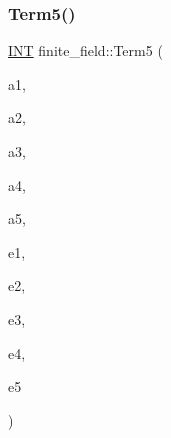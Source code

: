 \subsubsection{\texorpdfstring{Term5()}{Term5()}}
{\footnotesize\ttfamily \mbox{\hyperlink{galois_8h_a09fddde158a3a20bd2dcadb609de11dc}{I\+NT}} finite\+\_\+field\+::\+Term5 (\begin{DoxyParamCaption}\item[{\mbox{\hyperlink{galois_8h_a09fddde158a3a20bd2dcadb609de11dc}{I\+NT}}}]{a1,  }\item[{\mbox{\hyperlink{galois_8h_a09fddde158a3a20bd2dcadb609de11dc}{I\+NT}}}]{a2,  }\item[{\mbox{\hyperlink{galois_8h_a09fddde158a3a20bd2dcadb609de11dc}{I\+NT}}}]{a3,  }\item[{\mbox{\hyperlink{galois_8h_a09fddde158a3a20bd2dcadb609de11dc}{I\+NT}}}]{a4,  }\item[{\mbox{\hyperlink{galois_8h_a09fddde158a3a20bd2dcadb609de11dc}{I\+NT}}}]{a5,  }\item[{\mbox{\hyperlink{galois_8h_a09fddde158a3a20bd2dcadb609de11dc}{I\+NT}}}]{e1,  }\item[{\mbox{\hyperlink{galois_8h_a09fddde158a3a20bd2dcadb609de11dc}{I\+NT}}}]{e2,  }\item[{\mbox{\hyperlink{galois_8h_a09fddde158a3a20bd2dcadb609de11dc}{I\+NT}}}]{e3,  }\item[{\mbox{\hyperlink{galois_8h_a09fddde158a3a20bd2dcadb609de11dc}{I\+NT}}}]{e4,  }\item[{\mbox{\hyperlink{galois_8h_a09fddde158a3a20bd2dcadb609de11dc}{I\+NT}}}]{e5 }\end{DoxyParamCaption})}

\mbox{\label{classfinite__field_af03fd9260670049f21b9a135c24f6e69}} 
